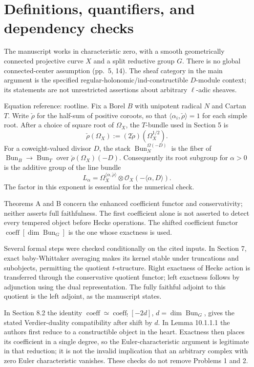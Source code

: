 \documentclass[10pt]{article}
\begin{document}
\section*{Definitions, quantifiers, and dependency checks}
The manuscript works in characteristic zero, with a smooth geometrically connected projective curve \(X\) and a split reductive group \(G\). There is no global connected-center assumption (pp. 5, 14). The sheaf category in the main argument is the specified regular-holonomic/ind-constructible \(D\)-module context; its statements are not unrestricted assertions about arbitrary \(\ell\)-adic sheaves.\par
Equation reference: rootline. Fix a Borel \(B\) with unipotent radical \(N\) and Cartan \(T\). Write \(\check\rho\) for the half-sum of positive coroots, so that \(\langle\alpha_i,\check\rho\rangle=1\) for each simple root. After a choice of square root of \(\Omega_X\), the \(T\)-bundle used in Section 5 is \[\check\rho(\Omega_X):=(2\check\rho)(\Omega_X^{1/2}).\] For a coweight-valued divisor \(D\), the stack \(\operatorname{Bun}_N^{\Omega(-D)}\) is the fiber of \(\operatorname{Bun}_B\to\operatorname{Bun}_T\) over \(\check\rho(\Omega_X)(-D)\). Consequently its root subgroup for \(\alpha>0\) is the additive group of the line bundle \[
 L_\alpha=\Omega_X^{\langle\alpha,\check\rho\rangle}
                 \otimes\mathcal O_X(-\langle\alpha,D\rangle).\] The factor in this exponent is essential for the numerical check.\par
Theorems A and B concern the enhanced coefficient functor and conservativity; neither asserts full faithfulness. The first coefficient alone is not asserted to detect every tempered object before Hecke operations. The shifted coefficient functor \(\operatorname{coeff}[\dim\operatorname{Bun}_G]\) is the one whose exactness is used.\par
Several formal steps were checked conditionally on the cited inputs. In Section 7, exact baby-Whittaker averaging makes its kernel stable under truncations and subobjects, permitting the quotient \(t\)-structure. Right exactness of Hecke action is transferred through the conservative quotient functor; left exactness follows by adjunction using the dual representation. The fully faithful adjoint to this quotient is the left adjoint, as the manuscript states.\par
In Section 8.2 the identity \(\operatorname{coeff}\simeq\operatorname{coeff}_![-2d]\), \(d=\dim\operatorname{Bun}_G\), gives the stated Verdier-duality compatibility after shift by \(d\). In Lemma 10.1.1.1 the authors first reduce to a constructible object in the heart. Exactness then places its coefficient in a single degree, so the Euler-characteristic argument is legitimate in that reduction; it is not the invalid implication that an arbitrary complex with zero Euler characteristic vanishes. These checks do not remove Problems 1 and 2.\par
\end{document}
